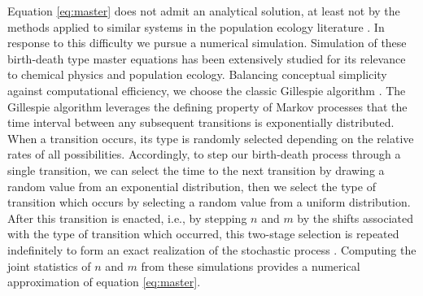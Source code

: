\documentclass[draft]{agujournal2018}
\begin{document}
Equation \ref{eq:master} does not admit an analytical solution, at least not by the methods applied to similar systems in the population ecology literature \citep[e.g][]{Swift2002}.
In response to this difficulty we pursue a numerical simulation.
Simulation of these birth-death type master equations has been extensively studied for its relevance to chemical physics and population ecology. 
Balancing conceptual simplicity against computational efficiency, we choose the classic Gillespie algorithm \citep{Gillespie1977, Gillespie1992, Gillespie2007}. 
The Gillespie algorithm leverages the defining property of Markov processes that the time interval between any subsequent transitions is exponentially distributed.
When a transition occurs, its type is randomly selected depending on the relative rates of all possibilities.
Accordingly, to step our birth-death process through a single transition, we can select the time to the next transition by drawing a random value from an exponential distribution, then we select the type of transition which occurs by selecting a random value from a uniform distribution. 
After this transition is enacted, i.e., by stepping $n$ and $m$ by the shifts associated with the type of transition which occurred, this two-stage selection is repeated indefinitely to form an exact realization of the stochastic process \citep{Gillespie1977, Gillespie1992, Gillespie2007}.
Computing the joint statistics of $n$ and $m$ from these simulations provides a numerical approximation of equation \ref{eq:master}.
\end{document}
